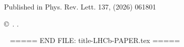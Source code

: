 \begin{titlepage}
\begin{center}
  Published in Phys. Rev. Lett. 137, (2026) 061801
\end{center}

\vspace{\fill}

{\footnotesize

\centerline{\copyright~\papercopyright. \href{\paperlicenceurl}{\paperlicence}.}}
\vspace*{2mm}

\end{titlepage}







\newpage
\setcounter{page}{2}
\mbox{~}
===== END FILE: title-LHCb-PAPER.tex =====
